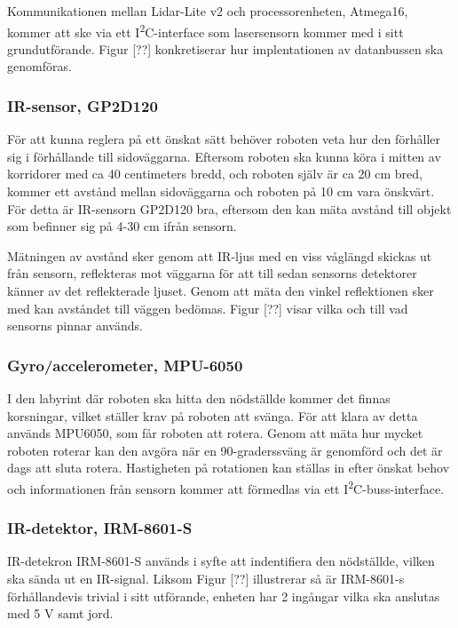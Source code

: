 \documentclass[11pt]{article}
\begin{document}
\begin{flushleft}
Kommunikationen mellan Lidar-Lite v2 och processorenheten, Atmega16, kommer att ske via ett I\textsuperscript{2}C-interface som lasersensorn kommer med i sitt grundutförande. Figur [??] konkretiserar hur implentationen av datanbussen ska genomföras. 

\subsubsection{IR-sensor, GP2D120}
För att kunna reglera på ett önskat sätt behöver roboten veta hur den förhåller sig i förhållande till sidoväggarna. Eftersom roboten ska kunna köra i mitten av korridorer med ca 40 centimeters bredd, och roboten själv är ca 20 cm bred, kommer ett avstånd mellan sidoväggarna och roboten på 10 cm vara önskvärt. För detta är IR-sensorn GP2D120 bra, eftersom den kan mäta avstånd till objekt som befinner sig på 4-30 cm ifrån sensorn. 

Mätningen av avstånd sker genom att IR-ljus med en viss våglängd skickas ut från sensorn, reflekteras mot väggarna för att till sedan sensorns detektorer känner av det reflekterade ljuset. Genom att mäta den vinkel reflektionen sker med kan avståndet till väggen bedömas.
Figur [??] visar vilka och till vad sensorns pinnar används.


\subsubsection{Gyro/accelerometer, MPU-6050}
I den labyrint där roboten ska hitta den nödställde kommer det finnas korsningar, vilket ställer krav på roboten att svänga. För att klara av detta används MPU6050, som får roboten att rotera. Genom att mäta hur mycket roboten roterar kan den avgöra när en 90-graderssväng är genomförd och det är dags att sluta rotera. Hastigheten på rotationen kan ställas in efter önskat behov och informationen från sensorn kommer att förmedlas via ett I\textsuperscript2C-buss-interface.
 
\subsubsection{IR-detektor, IRM-8601-S}
IR-detekron IRM-8601-S används i syfte att indentifiera den nödställde, vilken ska sända ut en IR-signal. Liksom Figur [??] illustrerar så är IRM-8601-s förhållandevis trivial i sitt utförande, enheten har 2 ingångar vilka ska anslutas med 5 V samt jord. 


\end{flushleft}
\end{document}
